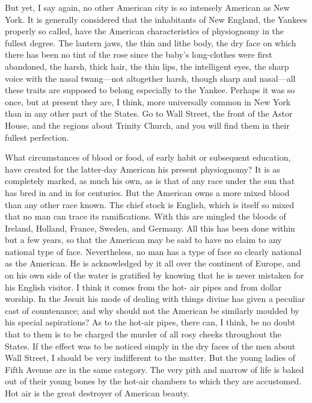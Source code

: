 But yet, I say again, no other American city is so intensely
American as New York.  It is generally considered that the
inhabitants of New England, the Yankees properly so called, have
the American characteristics of physiognomy in the fullest degree.
The lantern jaws, the thin and lithe body, the dry face on which
there has been no tint of the rose since the baby's long-clothes
were first abandoned, the harsh, thick hair, the thin lips, the
intelligent eyes, the sharp voice with the nasal twang---not
altogether harsh, though sharp and nasal---all these traits are
supposed to belong especially to the Yankee.  Perhaps it was so
once, but at present they are, I think, more universally common in
New York than in any other part of the States.  Go to Wall Street,
the front of the Astor House, and the regions about Trinity Church,
and you will find them in their fullest perfection.

What circumstances of blood or food, of early habit or subsequent
education, have created for the latter-day American his present
physiognomy?  It is as completely marked, as much his own, as is
that of any race under the sun that has bred in and in for
centuries.  But the American owns a more mixed blood than any other
race known.  The chief stock is English, which is itself so mixed
that no man can trace its ramifications.  With this are mingled the
bloods of Ireland, Holland, France, Sweden, and Germany.  All this
has been done within but a few years, so that the American may be
said to have no claim to any national type of face.  Nevertheless,
no man has a type of face so clearly national as the American.  He
is acknowledged by it all over the continent of Europe, and on his
own side of the water is gratified by knowing that he is never
mistaken for his English visitor.  I think it comes from the hot-
air pipes and from dollar worship.  In the Jesuit his mode of
dealing with things divine has given a peculiar cast of
countenance; and why should not the American be similarly moulded
by his special aspirations?  As to the hot-air pipes, there can, I
think, be no doubt that to them is to be charged the murder of all
rosy cheeks throughout the States.  If the effect was to be noticed
simply in the dry faces of the men about Wall Street, I should be
very indifferent to the matter.  But the young ladies of Fifth
Avenue are in the same category.  The very pith and marrow of life
is baked out of their young bones by the hot-air chambers to which
they are accustomed.  Hot air is the great destroyer of American
beauty.

